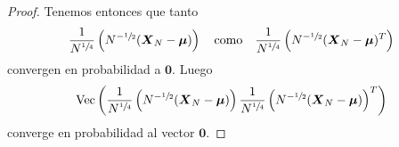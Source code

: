 \begin{proof}
  Tenemos entonces que tanto \[
    \frac{1}{N^{\sfrac{1}{4}}}\left(N^{-\sfrac{1}{2}}(\boldsymbol{X}_N - \boldsymbol \mu)\right)
    \quad
    \text{como}
    \quad
    \frac{1}{N^{\sfrac{1}{4}}}\left(N^{-\sfrac{1}{2}}(\boldsymbol{X}_N - \boldsymbol \mu)^T\right)
  \] convergen en probabilidad a \(\boldsymbol 0\).
  Luego \[
    \operatorname{Vec}\left(\frac{1}{N^{\sfrac{1}{4}}}\left(N^{-\sfrac{1}{2}}(\boldsymbol{X}_N - \boldsymbol \mu)\right) \frac{1}{N^{\sfrac{1}{4}}}\left(N^{-\sfrac{1}{2}}(\boldsymbol{X}_N - \boldsymbol \mu)\right)^T\right)
  \] converge en probabilidad al vector \(\boldsymbol 0\).
\end{proof}